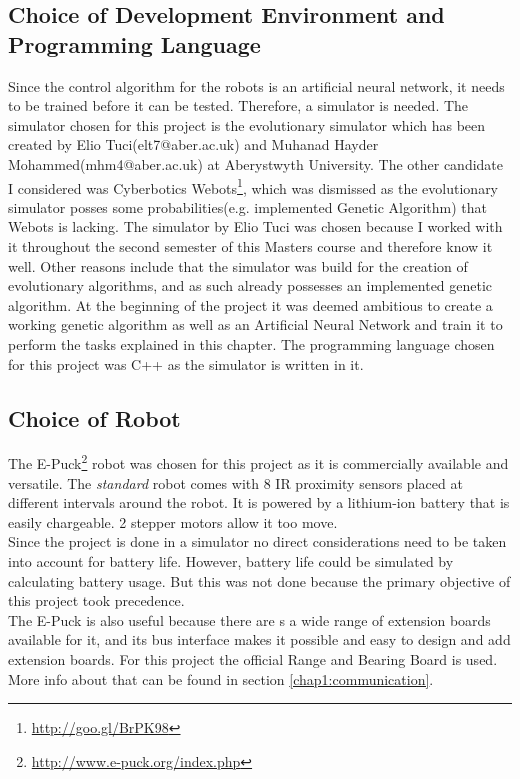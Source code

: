 \subsection{Choice of Development Environment and Programming Language}
Since the control algorithm for the robots is an artificial neural network, it needs to be trained before it can be tested. Therefore, a simulator is needed.
The simulator chosen for this project is the evolutionary simulator which has been created by Elio Tuci(elt7@aber.ac.uk) and Muhanad Hayder Mohammed(mhm4@aber.ac.uk) at Aberystwyth University. 
The other candidate I considered was Cyberbotics Webots\footnote{\url{http://goo.gl/BrPK98}}, which was dismissed as the evolutionary simulator posses some probabilities(e.g. implemented Genetic Algorithm) that Webots is lacking. 
The simulator by Elio Tuci was chosen because I worked with it throughout the second semester of this Masters course and therefore know it well. Other reasons include that the simulator was build for the creation of evolutionary algorithms, and as such already possesses an implemented genetic algorithm. 
At the beginning of the project it was deemed ambitious to create a working genetic algorithm as well as an Artificial Neural Network and train it to perform the tasks explained in this chapter. 
The programming language chosen for this project was C++ as the simulator is written in it. 

\subsection{Choice of Robot}
The E-Puck\footnote{\url{http://www.e-puck.org/index.php}} robot was chosen for this project as it is commercially available and versatile. 
The \textit{standard} robot comes with 8 IR proximity sensors placed at different intervals around the robot. It is powered by a lithium-ion battery that is easily chargeable. 2 stepper motors allow it too move\cite{mondada2009puck}. \\

Since the project is done in a simulator no direct considerations need to be taken into account for battery life. However, battery life could be simulated by calculating battery usage. But this was not done because the primary objective of this project took precedence.\\

The E-Puck is also useful because there are s a wide range of extension boards available for it, and its bus interface makes it possible and easy to design and add extension boards. 
For this project the official Range and Bearing Board is used. More info about that can be found in section \ref{chap1:communication}\cite{Gutierrez}.

